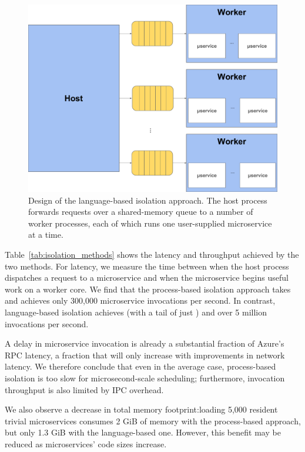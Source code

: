 \begin{figure}
\includegraphics[width=\columnwidth]{figs/system}
\caption{Design of the language-based isolation approach.  The host process forwards
requests over a shared-memory queue to a number of worker processes, each of which
runs one user-supplied microservice at a time.}
\label{fig:sysdesign}
\end{figure}

Table~\ref{tab:isolation_methods} shows the latency and throughput achieved
by the two methods. For latency, we measure the time between when the host
process dispatches a request to a microservice and when the microservice begins
useful work on a worker core. We find that the process-based isolation approach
takes  and achieves only 300,000 microservice invocations per
second. In contrast, language-based isolation achieves  (with a tail
of just ) and over 5 million invocations per second.

A  delay in microservice invocation is already a substantial fraction of
Azure's  RPC latency, a fraction that will only increase with
improvements in network latency. We therefore conclude that even in the average case,
process-based isolation is too slow for microsecond-scale scheduling; furthermore,
invocation throughput is also limited by IPC overhead.

We also observe a decrease in total memory footprint:\@ loading 5,000 resident
trivial microservices consumes 2 GiB of memory with the process-based approach, but
only 1.3 GiB with the language-based one.  However, this benefit may be reduced as
microservices' code sizes increase.

